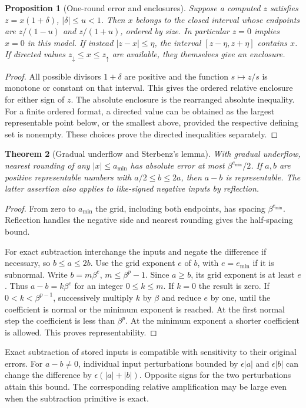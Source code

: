 \documentclass[11pt,oneside,openany]{book}
\theoremstyle{plain}
\newtheorem{theorem}{Theorem}[chapter]
\newtheorem{proposition}[theorem]{Proposition}
\theoremstyle{definition}
\theoremstyle{remark}
\begin{document}
\begin{proposition}[One-round error and enclosures]\label{p206:W03}
Suppose a computed \(z\) satisfies \(z=x(1+\delta)\),
\(|\delta|\le u<1\). Then \(x\) belongs to the closed interval
whose endpoints are \(z/(1-u)\) and \(z/(1+u)\), ordered by size.
In particular \(z=0\) implies \(x=0\) in this model. If instead
\(|z-x|\le\eta\), the interval \([z-\eta,z+\eta]\) contains \(x\).
If directed values \(z_\downarrow\le x\le z_\uparrow\)
are available, they themselves give an enclosure.
\end{proposition}
\begin{proof}
All possible divisors \(1+\delta\) are positive and the function
\(s\mapsto z/s\) is monotone or constant on that interval. This
gives the ordered relative enclosure for either sign of \(z\).
The absolute enclosure is the rearranged absolute inequality.
For a finite ordered format, a directed value can be obtained as
the largest representable point below, or the smallest above,
provided the respective defining set is nonempty. These choices
prove the directed inequalities separately.
\end{proof}

\begin{theorem}[Gradual underflow and Sterbenz's lemma]\label{p206:W04}
With gradual underflow, nearest rounding of any \(|x|\le a_{\min}\)
has absolute error at most \(\beta^{e_{\min}}/2\).
If \(a,b\) are positive representable numbers with
\(a/2\le b\le2a\), then \(a-b\) is representable.
The latter assertion also applies to like-signed negative inputs
by reflection.
\end{theorem}
\begin{proof}
From zero to \(a_{\min}\) the grid, including both endpoints,
has spacing \(\beta^{e_{\min}}\). Reflection handles the
negative side and nearest rounding gives the half-spacing bound.

For exact subtraction interchange the inputs and negate the
difference if necessary, so \(b\le a\le2b\).
Use the grid exponent \(e\) of \(b\), with \(e=e_{\min}\) if it is
subnormal. Write \(b=m\beta^e\), \(m\le\beta^p-1\).
Since \(a\ge b\), its grid exponent is at least \(e\).
Thus \(a-b=k\beta^e\) for an integer \(0\le k\le m\).
If \(k=0\) the result is zero. If \(0<k<\beta^{p-1}\),
successively multiply \(k\) by \(\beta\) and reduce \(e\) by one,
until the coefficient is normal or the minimum exponent is reached.
At the first normal step the coefficient is less than \(\beta^p\).
At the minimum exponent a shorter coefficient is allowed.
This proves representability.
\end{proof}
Exact subtraction of stored inputs is compatible with sensitivity
to their original errors. For \(a-b\ne0\), individual input
perturbations bounded by \(\epsilon |a|\) and \(\epsilon |b|\)
can change the difference by \(\epsilon(|a|+|b|)\).
Opposite signs for the two perturbations attain this bound.
The corresponding relative amplification may be large even
when the subtraction primitive is exact.
\end{document}
